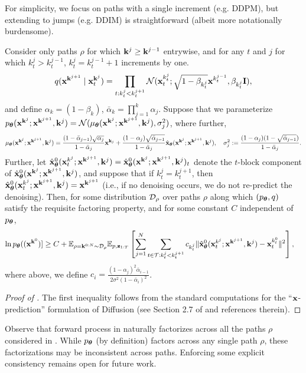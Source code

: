For simplicity, we focus on paths with a single increment (e.g. DDPM), but extending to jumps (e.g. DDIM) is straightforward (albeit more notationally burdensome). 
\begin{corollary}\label{cor:elbo} Consider only paths $\rho$ for which $\mathbf{k}^j \ge \mathbf{k}^{j-1}$ entrywise, and for any $t$ and $j$ for which $ k^j_t > k^{j-1}_t$, $k^j_t = k^{j-1}_t + 1$ increments by one. 
\begin{align}
q({\mathbf{x}}^{\mathbf{k}^{j+1}} \mid {\mathbf{x}}_t^{\mathbf{k}^j}) = \prod_{t:k^j_t < k^{j+1}_{t}}\mathcal{N}({\mathbf{x}}_t^{k^j_t}; \sqrt{1-\beta_{k^j_t}}{\mathbf{x}}^{k^{j-1}_t}, \beta_{k^j_t} \mathbf{I}), \label{eq:Q_form}
\end{align}
and define $\alpha_k = (1-\beta_k)$, $\bar{\alpha}_k = \prod_{j=1}^k \alpha_j$.  Suppose that we parameterize $p_{\bm{\theta}}({\mathbf{x}}^{\mathbf{k}^j}; {\mathbf{x}}^{\mathbf{k}^{j+1}},\mathbf{k}^j) = \mathcal{N}(\mu_{\bm{\theta}}({\mathbf{x}}^{\mathbf{k}^j}; {\mathbf{x}}^{\mathbf{k}^{j+1}},\mathbf{k}^j),\sigma_j^2)$, where further, 
\begin{align*}
\mu_{\bm{\theta}}({\mathbf{x}}^{\mathbf{k}^j}; {\mathbf{x}}^{\mathbf{k}^{j+1}},\mathbf{k}^j) = \frac{(1 - \bar{\alpha}_{j-1})\sqrt{{\alpha}_j}}{1-\bar{\alpha}_j} {\mathbf{x}}^{\mathbf{k}_j} +  \frac{(1 - {\alpha}_{j})\sqrt{\bar{\alpha}_{j-1}}}{1-\bar{\alpha}_j}\hat{{\mathbf{x}}}_{\bm\theta}({\mathbf{x}}^{\mathbf{k}^j}; {\mathbf{x}}^{\mathbf{k}^{j+1}},\mathbf{k}^j), \quad \sigma_j^2 := \frac{(1 - \alpha_{j})(1-\sqrt{\bar{\alpha}_{j-1}})}{1-\bar{\alpha}_j}.
\end{align*}
Further, let $\hat{{\mathbf{x}}}^0_{\bm{\theta}}({\mathbf{x}}_t^{k^j}; {\mathbf{x}}^{\mathbf{k}^{j+1}},\mathbf{k}^j) = \hat{{\mathbf{x}}}^0_{\bm{\theta}}({\mathbf{x}}^{\mathbf{k}^j}; {\mathbf{x}}^{\mathbf{k}^{j+1}},\mathbf{k}^j)_t$ denote the $t$-block component of $\hat{{\mathbf{x}}}^0_{\bm{\theta}}({\mathbf{x}}^{\mathbf{k}^j}; {\mathbf{x}}^{\mathbf{k}^{j+1}},\mathbf{k}^j)$, and suppose that if $k_t^j = k_t^{j+1}$, then $\hat{{\mathbf{x}}}^0_{\bm{\theta}}({\mathbf{x}}_t^{k^j}; {\mathbf{x}}^{\mathbf{k}^{j+1}},\mathbf{k}^j) = {\mathbf{x}}^{\mathbf{k}^{j+1}}$ (i.e., if no denoising occurs, we do not re-predict the denoising). Then, for some distribution ${\mathcal{D}}_{\rho}$ over paths $\rho$ along which $(p_{\bm{\theta}},q)$ satisfy the requisite factoring property, and for some constant $C$ independent of $p_{\bm{\theta}}$,  
\begin{align*}
\ln  p_{\bm{\theta}}(({\mathbf{x}}^{\mathbf{k}^0})]  &\ge C+ \mathbb{E}_{\rho = \mathbf{k}^{0:N} \sim {\mathcal{D}}_{\rho}}\mathbb{E}_{p,\mathbf{z}_{1:T}} \left[\sum_{j=1}^{N}\sum_{t\in {\mathcal{T}}: k_t^j < k_t^{j+1}} c_{k_t^j}\| \hat{{\mathbf{x}}}^0_{\bm{\theta}}({\mathbf{x}}_t^{k^j}; {\mathbf{x}}^{\mathbf{k}^{j+1}},\mathbf{k}^j) - {\mathbf{x}}_t^{k^0_t}\|^2 \right],
\end{align*}
where above, we define $c_i = \frac{(1 - \alpha_{j})^2\bar{\alpha}_{i-1}}{2\sigma^2(1 - \bar\alpha_{i})^2}$. 
\end{corollary}
\begin{proof}[Proof of ] The first inequality follows from the standard computations for the ``${\mathbf{x}}$-prediction'' formulation of Diffusion (see Section 2.7 of  \cite{chan2024tutorial} and references therein). 
\end{proof}
\begin{remark}[Factoring]
Observe that forward  process in  naturally factorizes across all the paths $\rho$ considered in . While $p_{\bm{\theta}}$ (by definition) factors across any single path $\rho$, these factorizations may be inconsistent across paths. Enforcing some explicit consistency remains open for future work.
\end{remark}


